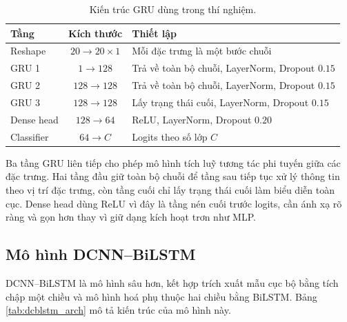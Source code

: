 \begin{table}[H]
\centering
\caption{Kiến trúc GRU dùng trong thí nghiệm.}
\label{tab:gru_arch}
\begin{tabularx}{\textwidth}{l c X}
\hline
Tầng & Kích thước & Thiết lập \\
\hline
Reshape & $20\rightarrow20\times1$ & Mỗi đặc trưng là một bước chuỗi \\
GRU 1 & $1\rightarrow128$ & Trả về toàn bộ chuỗi, LayerNorm, Dropout $0.15$ \\
GRU 2 & $128\rightarrow128$ & Trả về toàn bộ chuỗi, LayerNorm, Dropout $0.15$ \\
GRU 3 & $128\rightarrow128$ & Lấy trạng thái cuối, LayerNorm, Dropout $0.15$ \\
Dense head & $128\rightarrow64$ & ReLU, LayerNorm, Dropout $0.20$ \\
Classifier & $64\rightarrow C$ & Logits theo số lớp $C$ \\
\hline
\end{tabularx}
\end{table}

Ba tầng GRU liên tiếp cho phép mô hình tích luỹ tương tác phi tuyến giữa các đặc trưng. Hai tầng đầu giữ toàn bộ chuỗi để tầng sau tiếp tục xử lý thông tin theo vị trí đặc trưng, còn tầng cuối chỉ lấy trạng thái cuối làm biểu diễn toàn cục. Dense head dùng ReLU vì đây là tầng nén cuối trước logits, cần ánh xạ rõ ràng và gọn hơn thay vì giữ dạng kích hoạt trơn như MLP.

\subsection{Mô hình DCNN--BiLSTM}
\label{sec:dcblstm_arch}

DCNN--BiLSTM \cite{hnamte2023dcnnbilstm} là mô hình sâu hơn, kết hợp trích xuất mẫu cục bộ bằng tích chập một chiều và mô hình hoá phụ thuộc hai chiều bằng BiLSTM. Bảng \ref{tab:dcblstm_arch} mô tả kiến trúc của mô hình này.

